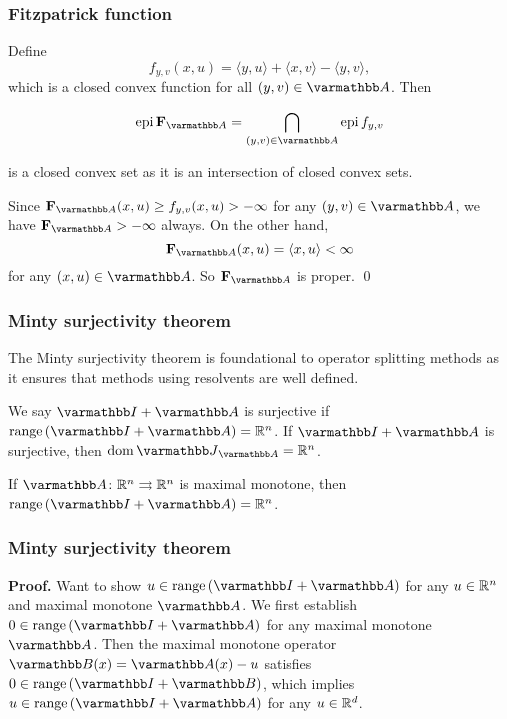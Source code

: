\documentclass[10pt,mathserif]{beamer}
\begin{document}
\begin{frame}
\frametitle{Fitzpatrick function}
Define
\[
f_{y,v}(x,u)=\langle y,u\rangle+\langle x,v\rangle-\langle y,v\rangle,
\]
which is a closed convex function for all $(y,v)\in \opA$.
Then
\vspace{-0.05in}

\[
\epi \fitzpatrick_\opA=\bigcap_{(y,v)\in \opA}\epi f_{y,v}
\]
\vspace{-0.1in}

is a closed convex set as it is an intersection of closed convex sets.
\vspace{0.2in}

Since $\fitzpatrick_\opA(x,u)\ge f_{y,v}(x,u)>-\infty$ for any $(y,v)\in \opA$,
we have $\fitzpatrick_\opA>-\infty$ always.
On the other hand, 
\[
\fitzpatrick_\opA(x,u)=\langle x,u\rangle <\infty
\]
for any $(x,u)\in \opA$. So $\fitzpatrick_\opA$ is proper.
\qed
\end{frame}



\begin{frame}
\frametitle{Minty surjectivity theorem}
The Minty surjectivity theorem is foundational to operator splitting methods as it ensures that methods using resolvents are well defined.

\vspace{0.2in}
We say $\opI+\opA$ is surjective if $\range (\opI+\opA)=\reals^n$.
If $\opI+\opA$ is surjective, then $\dom \opJ_\opA=\reals^n$.
\vspace{0.2in}

\setcounter{theorem}{7}
\begin{theorem}
\label{thm:minty}
If $\opA\colon\reals^n\rightrightarrows \reals^n$ is maximal monotone, then $\range(\opI+\opA)=\reals^n$.
\end{theorem}
\end{frame}


\begin{frame}
\frametitle{Minty surjectivity theorem}
\textbf{Proof.}
Want to show $u\in \range (\opI+\opA)$ for any  $u\in \mathbb{R}^n$ and maximal monotone $\opA$.
We first establish $0\in \range(\opI+\opA)$ for any maximal monotone $\opA$.
Then the maximal monotone operator $\opB(x)=\opA(x)-u$ satisfies $0\in \range(\opI+\opB)$,
which implies $u\in \range(\opI+\opA)$ for any $u\in \mathbb{R}^d$.



\end{frame}
\end{document}
